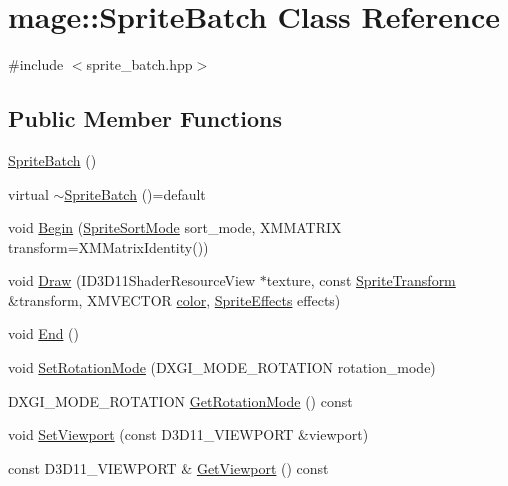 \hypertarget{classmage_1_1_sprite_batch}{}\section{mage\+:\+:Sprite\+Batch Class Reference}
\label{classmage_1_1_sprite_batch}


{\ttfamily \#include $<$sprite\+\_\+batch.\+hpp$>$}

\subsection*{Public Member Functions}
\begin{DoxyCompactItemize}
\item 
\hyperlink{classmage_1_1_sprite_batch_a75924326627c792ff454d9d2a2ba1fda}{Sprite\+Batch} ()
\item 
virtual \hyperlink{classmage_1_1_sprite_batch_ab0e2b5af638de0a6a3bbcf2bba6c730a}{$\sim$\+Sprite\+Batch} ()=default
\item 
void \hyperlink{classmage_1_1_sprite_batch_ac7b901a07bdf23f624c9cf156a224c21}{Begin} (\hyperlink{namespacemage_a256fa5833eecc408923de7ffadb5e014}{Sprite\+Sort\+Mode} sort\+\_\+mode, X\+M\+M\+A\+T\+R\+IX transform=X\+M\+Matrix\+Identity())
\item 
void \hyperlink{classmage_1_1_sprite_batch_aa094c159600f6bca01c7f3aec96703ca}{Draw} (I\+D3\+D11\+Shader\+Resource\+View $\ast$texture, const \hyperlink{structmage_1_1_sprite_transform}{Sprite\+Transform} \&transform, X\+M\+V\+E\+C\+T\+OR \hyperlink{namespacemage_a56eceea5a9bceb2b56073f3ea4945781}{color}, \hyperlink{namespacemage_a06ff9ac76b1e0636cc8949c3f0d4ac46}{Sprite\+Effects} effects)
\item 
void \hyperlink{classmage_1_1_sprite_batch_a9764372bb18b1c24a4a2f64ab0649569}{End} ()
\item 
void \hyperlink{classmage_1_1_sprite_batch_a61ab7462374d9190220629be7827ba4b}{Set\+Rotation\+Mode} (D\+X\+G\+I\+\_\+\+M\+O\+D\+E\+\_\+\+R\+O\+T\+A\+T\+I\+ON rotation\+\_\+mode)
\item 
D\+X\+G\+I\+\_\+\+M\+O\+D\+E\+\_\+\+R\+O\+T\+A\+T\+I\+ON \hyperlink{classmage_1_1_sprite_batch_ade698c44432d175ca55a4545b9adae85}{Get\+Rotation\+Mode} () const
\item 
void \hyperlink{classmage_1_1_sprite_batch_aab9eab10e3ea1c62b483a67a47d9ccdc}{Set\+Viewport} (const D3\+D11\+\_\+\+V\+I\+E\+W\+P\+O\+RT \&viewport)
\item 
const D3\+D11\+\_\+\+V\+I\+E\+W\+P\+O\+RT \& \hyperlink{classmage_1_1_sprite_batch_a67bdd7fb00644aefb3c7ecfaa7923a39}{Get\+Viewport} () const
\end{DoxyCompactItemize}
